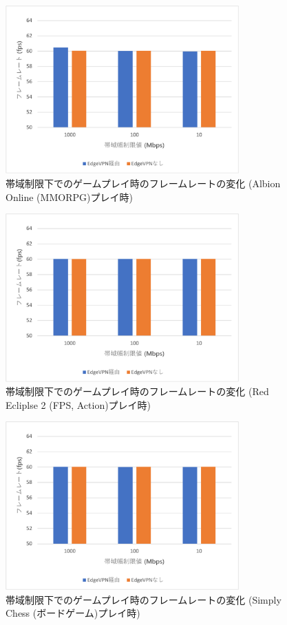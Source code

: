 \begin{figure}[h!]
    \centering
    \includegraphics[width=0.8\textwidth,keepaspectratio,clip]{img/framerate_MMO.pdf}
    \caption{帯域制限下でのゲームプレイ時のフレームレートの変化 (Albion Online (MMORPG)プレイ時)}
    \label{fig:fps_mmo}
\end{figure}

\begin{figure}[h!]
    \centering
    \includegraphics[width=0.8\textwidth,keepaspectratio,clip]{img/framerate_FPS.pdf}
    \caption{帯域制限下でのゲームプレイ時のフレームレートの変化 (Red Ecliplse 2 (FPS, Action)プレイ時)}
    \label{fig:fps_fps}
\end{figure}

\begin{figure}[h!]
    \centering
    \includegraphics[width=0.8\textwidth,keepaspectratio,clip]{img/framerate_Board.pdf}
    \caption{帯域制限下でのゲームプレイ時のフレームレートの変化 (Simply Chess (ボードゲーム)プレイ時)}
    \label{fig:fps_board}
\end{figure}


